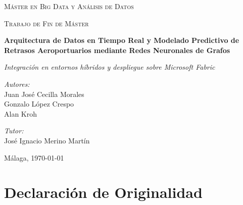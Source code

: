 \documentclass[12pt,oneside,a4paper]{report}
\renewcommand{\_}{\textunderscore\allowbreak}
\begin{document}
\begin{titlepage}
    \centering
    {\scshape\Large Máster en Big Data y Análisis de Datos \par}
    \vspace{1cm}
    {\scshape\large Trabajo de Fin de Máster \par}
    \vspace{2.5cm}
    {\huge\bfseries Arquitectura de Datos en Tiempo Real y Modelado Predictivo de Retrasos Aeroportuarios mediante Redes Neuronales de Grafos \par}
    \vspace{0.5cm}
    {\large\itshape Integración en entornos híbridos y despliegue sobre Microsoft Fabric \par}
    \vspace{3.5cm}
    \begin{minipage}[t]{0.45\textwidth}
        \begin{flushleft} \large
            \emph{Autores:}\\
            Juan José Cecilla Morales\\
            Gonzalo López Crespo\\
            Alan Kroh
        \end{flushleft}
    \end{minipage}
    \hfill
    \begin{minipage}[t]{0.45\textwidth}
        \begin{flushright} \large
            \emph{Tutor:} \\
            José Ignacio Merino Martín\\
        \end{flushright}
    \end{minipage}
    \vfill
    \vspace{2cm}
    {\large Málaga, \today \par}
\end{titlepage}

\newpage
\thispagestyle{empty}
\chapter*{Declaración de Originalidad}
\vspace{1cm}
\end{document}
